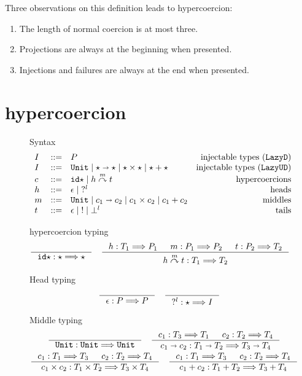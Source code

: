 \documentclass[acmsmall,review,anonymous]{acmart}\settopmatter{printfolios=true,printccs=false,printacmref=false}
\newcommand{\stxrule}[3]{#1 & ::= & #3 & \text{#2}\\}
\newcommand{\plus}[0]{+}
\newcommand{\lazyUD}{$\mathtt{Lazy UD}$}
\newcommand{\lazyD}{$\mathtt{Lazy D}$}
\newcommand{\TOOdyn}[0]{\star}
\newcommand{\POOunit}[0]{\mathtt{Unit}}
\newcommand{\POOfun}[2]{#1 \shortrightarrow #2}
\newcommand{\POOprod}[2]{#1 \times #2}
\newcommand{\POOsum}[2]{#1 \plus #2}
\newcommand{\typingHC}[3]{#1 : #2 \Longrightarrow #3}
\newcommand{\hyperCoercionI}[0]{\mathtt{id\star}}
\newcommand{\hyperCoercionC}[3]{#1 \overset{#2}{\curvearrowright} #3}
\begin{document}
Three observations on this definition leads to hypercoercion: 
\begin{enumerate}
	\item The length of normal coercion is at most three.
	\item Projections are always at the beginning when presented.
	\item Injections and failures are always at the end when presented.
\end{enumerate}


\section{hypercoercion} \label{sec:hypercoercion}

\begin{figure}
	Syntax
	\[
	\begin{array}{lclr}
	\stxrule{I}{injectable types (\lazyD)}{P}
	\stxrule{I}{injectable types (\lazyUD)}{
		\POOunit \mid
		\POOfun{\TOOdyn}{\TOOdyn} \mid
		\POOprod{\TOOdyn}{\TOOdyn} \mid
		\POOsum{\TOOdyn}{\TOOdyn}
	}
	\stxrule{c}{hypercoercions}{
		\hyperCoercionI \mid{}
		\hyperCoercionC{h}{m}{t}
	}
	\stxrule{h}{heads}{
		\epsilon \mid{}
		?^l
	}
	\stxrule{m}{middles}{
		\POOunit \mid
		\POOfun{c_1}{c_2} \mid
		\POOprod{c_1}{c_2} \mid
		\POOsum{c_1}{c_2}
	}
	\stxrule{t}{tails}{
		\epsilon \mid{}
		! \mid{}
		\bot^l
	}
	\end{array}
	\]
		
	hypercoercion typing 
	\begin{gather*}
	\inference{}{\typingHC{\hyperCoercionI}{\TOOdyn}{\TOOdyn}}
	\quad
	\inference{
		\typingHC{h}{T_1}{P_1} &
		\typingHC{m}{P_1}{P_2} &
		\typingHC{t}{P_2}{T_2}
	}{
		\typingHC{\hyperCoercionC{h}{m}{t}}{T_1}{T_2}
	}
	\end{gather*}
	
	Head typing \fbox{$ \typingHC{h}{T}{P} $}
	\begin{gather*}
	\inference{}{\typingHC{\epsilon}{P}{P}}
	\quad
	\inference{}{\typingHC{?^l}{\TOOdyn}{I}}
	\end{gather*}
	
	Middle typing \fbox{$ \typingHC{m}{T}{T} $}
	\begin{gather*}
	\inference{}{\typingHC{\POOunit}{\POOunit}{\POOunit}}
	\quad
	\inference{
		\typingHC{c_1}{T_3}{T_1} &
		\typingHC{c_2}{T_2}{T_4}
	}{
		\typingHC{\POOfun{c_1}{c_2}}{\POOfun{T_1}{T_2}}{\POOfun{T_3}{T_4}}
	}
	\\
	\inference{
		\typingHC{c_1}{T_1}{T_3} &
		\typingHC{c_2}{T_2}{T_4}
	}{
		\typingHC{\POOprod{c_1}{c_2}}{\POOprod{T_1}{T_2}}{\POOprod{T_3}{T_4}}
	}
	\quad
	\inference{
		\typingHC{c_1}{T_1}{T_3} &
		\typingHC{c_2}{T_2}{T_4}
	}{
		\typingHC{\POOsum{c_1}{c_2}}{\POOsum{T_1}{T_2}}{\POOsum{T_3}{T_4}}
	}
		\end{gather*}
		

\end{figure}
\end{document}
